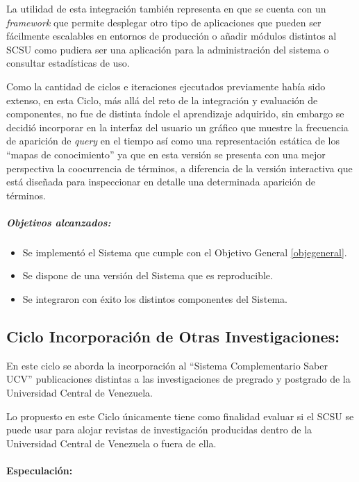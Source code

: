 \documentclass[
  12pt,
  openany]{book}
\begin{document}
La utilidad de esta integración también representa en que se cuenta con un \emph{framework} que permite desplegar otro tipo de aplicaciones que pueden ser fácilmente escalables en entornos de producción o añadir módulos distintos al SCSU como pudiera ser una aplicación para la administración del sistema o consultar estadísticas de uso.

Como la cantidad de ciclos e iteraciones ejecutados previamente había sido extenso, en esta Ciclo, más allá del reto de la integración y evaluación de componentes, no fue de distinta índole el aprendizaje adquirido, sin embargo se decidió incorporar en la interfaz del usuario un gráfico que muestre la frecuencia de aparición de \emph{query} en el tiempo así como una representación estática de los ``mapas de conocimiento'' ya que en esta versión se presenta con una mejor perspectiva la coocurrencia de términos, a diferencia de la versión interactiva que está diseñada para inspeccionar en detalle una determinada aparición de términos.

\hypertarget{objetivos-alcanzados-2}{%
\subparagraph{Objetivos alcanzados:}\label{objetivos-alcanzados-2}}

\begin{itemize}
\item
  Se implementó el Sistema que cumple con el Objetivo General \ref{objegeneral}.
\item
  Se dispone de una versión del Sistema que es reproducible.
\item
  Se integraron con éxito los distintos componentes del Sistema.
\end{itemize}

\newpage

\hypertarget{desarrollociclos6}{%
\subsection{Ciclo Incorporación de Otras Investigaciones:}\label{desarrollociclos6}}

En este ciclo se aborda la incorporación al ``Sistema Complementario Saber UCV'' publicaciones distintas a las investigaciones de pregrado y postgrado de la Universidad Central de Venezuela.

Lo propuesto en este Ciclo únicamente tiene como finalidad evaluar si el SCSU se puede usar para alojar revistas de investigación producidas dentro de la Universidad Central de Venezuela o fuera de ella.

\hypertarget{dcseisespe}{%
\paragraph{Especulación:}\label{dcseisespe}}
\end{document}
